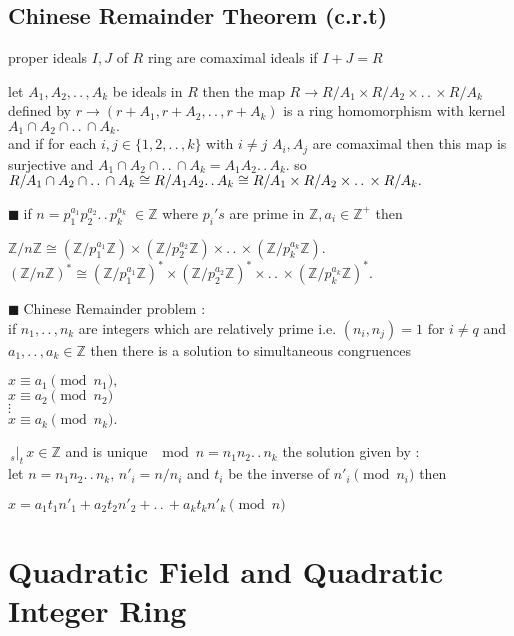 \documentclass[11pt]{extarticle}
\newcommand{\ra}{\rightarrow}
\newcommand{\Z}{\mathbb{Z}}
\newcommand{\w}[1]{\text{#1}}
\newcommand{\ck}{.\,.\,}
\newcommand{\tm}{\times}
\newcommand{\st}{\,{}_{s}|_t\,}
\newcommand{\tbx}[2][]{
	\begin{tcolorbox}[enhanced,breakable,size=small,colback=black!2!white,title={#1},arc is angular, arc=1.5mm,drop fuzzy shadow]
		#2
	\end{tcolorbox}
}
\newcommand{\y}{$\blacksquare\;$}
\begin{document}
\begin{multicols}{2}
	\subsection{Chinese Remainder Theorem (c.r.t)}

\tbx{proper ideals $ I,J $ of $ R $ ring are comaximal ideals if $ I+J=R $
} 
\tbx[c.r.t]{ let $ A_1,A_2,\ck , A_k $ be ideals in $ R $ then the map 
	$ R \ra R/A_1 \tm R/A_2 \tm \ck \tm R/A_k $ defined by $ r \ra (r+A_1,r+A_2,\ck , r+A_k) $ is a 
	ring homomorphism with kernel $ A_1\cap A_2 \cap \ck \cap A_k. $\\
	and if for each $ i,j \in \{1,2,\ck , k\} $ with $ i\neq j $ $ A_i,A_j $ are comaximal then this 
	map is surjective and  $ A_1\cap A_2 \cap \ck \cap A_k=A_1A_2\ck A_k. $ so 
  $ R/ A_1\cap A_2 \cap \ck \cap A_k\cong\\
   R/A_1A_2\ck A_k\cong R/A_1 \tm R/A_2 \tm \ck \tm R/A_k.$  } 
\tbx[Consequences of c.r.t]{
	\y if $ n=p_1^{a_1}p_2^{a_2}\ck p_k^{a_k} \; \in \Z $ where $ p_i's$ are prime in $ \Z, a_i\in  
	\Z^+ $ then 
	\begin{center}
		$ \Z/n\Z \cong (\Z/p_1^{a_1}\Z)\tm (\Z/p_2^{a_2}\Z)\tm \ck \tm (\Z/p_k^{a_k}\Z). $
		$ (\Z/n\Z)^* \cong (\Z/p_1^{a_1}\Z)^*\tm (\Z/p_2^{a_2}\Z)^*\tm \ck \tm (\Z/p_k^{a_k}\Z)^*. $
	\end{center}
	
	\y Chinese Remainder problem : \\
	if $ n_1,\ck ,n_k $ are integers which are relatively prime i.e. $ (n_i,n_j)=1 \w{ for } i\neq q$
	and $ a_1,\ck , a_k \in \Z $  then there is a solution to simultaneous congruences 
	\begin{center}
		$ x\equiv a_1 \pmod{n_1},$\\
		$x\equiv a_2\pmod{n_2} $\\
		$\vdots$\\
		$ x\equiv a_k\pmod{n_k}  .$
	\end{center} $ \st x\in \Z $ and is unique $ \mod n=n_1n_2\ck n_k $
	the solution given by :\\
	let $n=n_1n_2\ck n_k , \, n'_i=n/n_i$ and $ t_i $  be the inverse of $ n'_i \pmod{n_i }$ then
	\begin{center}
		$ x=a_1t_1n'_1+a_2t_2n'_2+\ck +a_kt_kn'_k \pmod n $
	\end{center}
} 

		\section{\normalsize  Quadratic Field and Quadratic Integer Ring}


\end{multicols}
\end{document}
